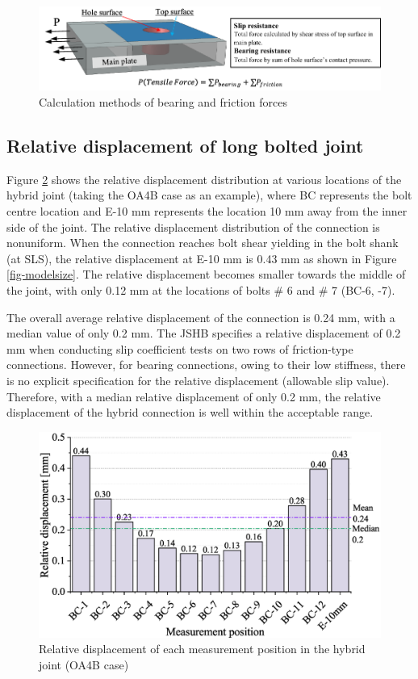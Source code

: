 \begin{figure}
    \centering
    \includegraphics[width=0.85\linewidth]{imgs/ch7/how2cal-fbfs.pdf}
    \caption{Calculation methods of bearing and friction forces}
    \label{fig-how2cal-fbfs}
\end{figure}

\subsection{Relative displacement of long bolted joint}

Figure \ref{rd-distri} shows the relative displacement distribution at various locations of the hybrid joint (taking the OA4B case as an example), where BC represents the bolt centre location and E-10 mm represents the location 10 mm away from the inner side of the joint. The relative displacement distribution of the connection is nonuniform. When the connection reaches bolt shear yielding in the bolt shank (at SLS), the relative displacement at E-10 mm is 0.43 mm as shown in Figure \ref{fig-modelsize}. The relative displacement becomes smaller towards the middle of the joint, with only 0.12 mm at the locations of bolts \# 6 and \# 7 (BC-6, -7).

The overall average relative displacement of the connection is 0.24 mm, with a median value of only 0.2 mm. The JSHB \cite{douji2017} specifies a relative displacement of 0.2 mm when conducting slip coefficient tests on two rows of friction-type connections. However, for bearing connections, owing to their low stiffness, there is no explicit specification for the relative displacement (allowable slip value). Therefore, with a median relative displacement of only 0.2 mm, the relative displacement of the hybrid connection is well within the acceptable range.


\begin{figure}[htbp]
\centering
    \includegraphics[width=0.7\linewidth]{imgs/ch7/RD-distri-oa4b.eps}
    \caption{Relative displacement of each measurement position in the hybrid joint (OA4B case)}
    \label{rd-distri}
\end{figure}


